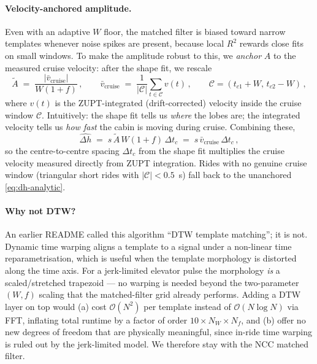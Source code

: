 \paragraph{Velocity-anchored amplitude.} Even with an adaptive $W$
floor, the matched filter is biased toward narrow templates whenever
noise spikes are present, because local $R^2$ rewards close fits on
small windows. To make the amplitude robust to this, we \emph{anchor}
$A$ to the measured cruise velocity: after the shape fit, we rescale
\begin{equation}
  \widetilde{A} \;=\; \frac{|\bar v_\mathrm{cruise}|}{W(1+f)}\,,
  \qquad
  \bar v_\mathrm{cruise}
  \;=\;
  \frac{1}{|\mathcal{C}|}\sum_{t\in\mathcal{C}} v(t)\,,
  \qquad
  \mathcal{C} = (t_{c1}{+}W,\,t_{c2}{-}W)\,,
  \label{eq:velocity-anchor}
\end{equation}
where $v(t)$ is the ZUPT-integrated (drift-corrected) velocity inside
the cruise window $\mathcal{C}$. Intuitively: the shape fit tells us
\emph{where} the lobes are; the integrated velocity tells us \emph{how
fast} the cabin is moving during cruise. Combining these,
\begin{equation}
  \widehat{\Delta h} \;=\; s\,\widetilde{A}\,W(1+f)\,\Delta t_c
  \;=\; s\,\bar v_\mathrm{cruise}\,\Delta t_c\,,
  \label{eq:dh-anchored}
\end{equation}
so the centre-to-centre spacing $\Delta t_c$ from the shape fit
multiplies the cruise velocity measured directly from ZUPT integration.
Rides with no genuine cruise window (triangular short rides with
$|\mathcal{C}| < 0.5$~s) fall back to the unanchored
\eqref{eq:dh-analytic}.

\paragraph{Why not DTW?} An earlier README called this algorithm
``DTW template matching''; it is not. Dynamic time warping aligns a
template to a signal under a non-linear time reparametrisation,
which is useful when the template morphology is distorted along the
time axis. For a jerk-limited elevator pulse the morphology
\emph{is} a scaled/stretched trapezoid — no warping is needed beyond
the two-parameter $(W,f)$ scaling that the matched-filter grid
already performs. Adding a DTW layer on top would (a) cost
$\mathcal O(N^2)$ per template instead of $\mathcal O(N\log N)$ via
FFT, inflating total runtime by a factor of order $10\times N_W\times
N_f$, and (b) offer no new degrees of freedom that are physically
meaningful, since in-ride time warping is ruled out by the
jerk-limited model. We therefore stay with the NCC matched filter.

